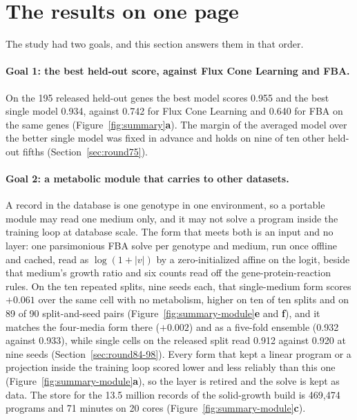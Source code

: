 
\section{The results on one page}
\label{sec:summary}

The study had two goals, and this section answers them in that order.

\paragraph{Goal 1: the best held-out score, against Flux Cone Learning and FBA.} On the
195 released held-out genes the best model scores 0.955 and the best single model 0.934,
against 0.742 for Flux Cone Learning and 0.640 for FBA on the same genes
(Figure~\ref{fig:summary}\textbf{a}). The margin of the averaged model over the better
single model was fixed in advance and holds on nine of ten other held-out fifths
(Section~\ref{sec:round75}).

\paragraph{Goal 2: a metabolic module that carries to other datasets.} A record in the
database is one genotype in one environment, so a portable module may read one medium
only, and it may not solve a program inside the training loop at database scale. The
form that meets both is an input and no layer: one parsimonious FBA solve per genotype and
medium, run once offline and cached, read as $\log(1 + |v|)$ by a zero-initialized affine
on the logit, beside that medium's growth ratio and six counts read off the
gene-protein-reaction rules. On the ten repeated splits, nine seeds each, that
single-medium form scores $+0.061$ over the same cell with no metabolism, higher on ten of
ten splits and on 89 of 90 split-and-seed pairs
(Figure~\ref{fig:summary-module}\textbf{e} and \textbf{f}), and it matches the four-media form
there ($+0.002$) and as a five-fold ensemble (0.932 against 0.933), while single cells on
the released split read 0.912 against 0.920 at nine seeds (Section~\ref{sec:round84-98}). Every form that kept a linear program or a
projection inside the training loop scored lower and less reliably than this one
(Figure~\ref{fig:summary-module}\textbf{a}), so the layer is retired and the solve is kept as
data. The store for the 13.5 million records of the solid-growth build is 469,474
programs and 71 minutes on 20 cores (Figure~\ref{fig:summary-module}\textbf{c}).

